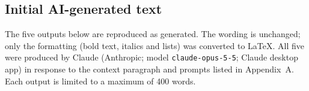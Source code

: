 \subsection{Initial AI-generated text}
\label{app:B}

The five outputs below are reproduced as generated. The wording is unchanged; only the formatting (bold text, italics and lists) was converted to LaTeX. All five were produced by Claude (Anthropic; model \texttt{claude-opus-5-5}; Claude desktop app) in response to the context paragraph and prompts listed in Appendix~A. Each output is limited to a maximum of 400 words.

